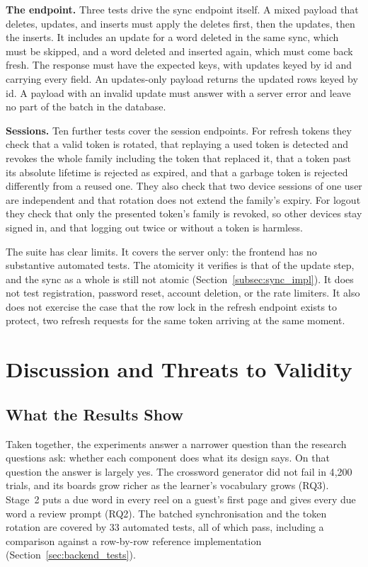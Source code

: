     \begin{sloppypar}
    \textbf{The endpoint.} Three tests drive the sync endpoint itself. A mixed payload that deletes, updates, and inserts must apply the deletes first, then the updates, then the inserts. It includes an update for a word deleted in the same sync, which must be skipped, and a word deleted and inserted again, which must come back fresh. The response must have the expected keys, with updates keyed by id and carrying every field. An updates-only payload returns the updated rows keyed by id. A payload with an invalid update must answer with a server error and leave no part of the batch in the database.
    \end{sloppypar}

    \textbf{Sessions.} Ten further tests cover the session endpoints. For refresh tokens they check that a valid token is rotated, that replaying a used token is detected and revokes the whole family including the token that replaced it, that a token past its absolute lifetime is rejected as expired, and that a garbage token is rejected differently from a reused one. They also check that two device sessions of one user are independent and that rotation does not extend the family's expiry. For logout they check that only the presented token's family is revoked, so other devices stay signed in, and that logging out twice or without a token is harmless.

    The suite has clear limits. It covers the server only: the frontend has no substantive automated tests. The atomicity it verifies is that of the update step, and the sync as a whole is still not atomic (Section~\ref{subsec:sync_impl}). It does not test registration, password reset, account deletion, or the rate limiters. It also does not exercise the case that the row lock in the refresh endpoint exists to protect, two refresh requests for the same token arriving at the same moment.


\section{Discussion and Threats to Validity}
\label{sec:eval_discussion}

    \subsection{What the Results Show}
    \begin{sloppypar}
    Taken together, the experiments answer a narrower question than the research questions ask: whether each component does what its design says. On that question the answer is largely yes. The crossword generator did not fail in 4{,}200 trials, and its boards grow richer as the learner's vocabulary grows (RQ3). Stage~2 puts a due word in every reel on a guest's first page and gives every due word a review prompt (RQ2). The batched synchronisation and the token rotation are covered by 33 automated tests, all of which pass, including a comparison against a row-by-row reference implementation (Section~\ref{sec:backend_tests}).
    \end{sloppypar}

